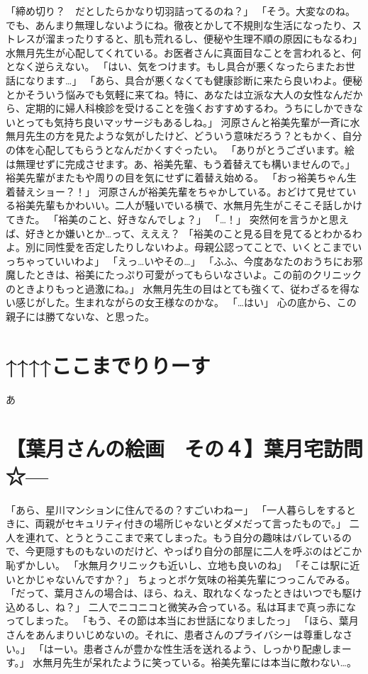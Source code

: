 「締め切り？　だとしたらかなり切羽詰ってるのね？」
「そう。大変なのね。でも、あんまり無理しないようにね。徹夜とかして不規則な生活になったり、ストレスが溜まったりすると、肌も荒れるし、便秘や生理不順の原因にもなるわ」
水無月先生が心配してくれている。お医者さんに真面目なことを言われると、何となく逆らえない。
「はい、気をつけます。もし具合が悪くなったらまたお世話になります…」
「あら、具合が悪くなくても健康診断に来たら良いわよ。便秘とかそういう悩みでも気軽に来てね。特に、あなたは立派な大人の女性なんだから、定期的に婦人科検診を受けることを強くおすすめするわ。うちにしかできないとっても気持ち良いマッサージもあるしね。」
河原さんと裕美先輩が一斉に水無月先生の方を見たような気がしたけど、どういう意味だろう？ともかく、自分の体を心配してもらうとなんだかくすぐったい。
「ありがとうございます。絵は無理せずに完成させます。あ、裕美先輩、もう着替えても構いませんので。」
裕美先輩がまたもや周りの目を気にせずに着替え始める。
「おっ裕美ちゃん生着替えショー？！」
河原さんが裕美先輩をちゃかしている。おどけて見せている裕美先輩もかわいい。二人が騒いでいる横で、水無月先生がこそこそ話しかけてきた。
「裕美のこと、好きなんでしょ？」
「…！」
突然何を言うかと思えば、好きとか嫌いとか…って、えええ？
「裕美のこと見る目を見てるとわかるわよ。別に同性愛を否定したりしないわよ。母親公認ってことで、いくとこまでいっちゃっていいわよ」
「えっ…いやその…」
「ふふ、今度あなたのおうちにお邪魔したときは、裕美にたっぷり可愛がってもらいなさいよ。この前のクリニックのときよりもっと過激にね。」
水無月先生の目はとても強くて、従わざるを得ない感じがした。生まれながらの女王様なのかな。
「…はい」
心の底から、この親子には勝てないな、と思った。

\section{↑↑↑↑ここまでりりーす}
あ

\section{【葉月さんの絵画　その４】葉月宅訪問　☆---}

「あら、星川マンションに住んでるの？すごいわねー」
「一人暮らしをするときに、両親がセキュリティ付きの場所じゃないとダメだって言ったもので。」
二人を連れて、とうとうここまで来てしまった。もう自分の趣味はバレているので、今更隠すものもないのだけど、やっぱり自分の部屋に二人を呼ぶのはどこか恥ずかしい。
「水無月クリニックも近いし、立地も良いのね」
「そこは駅に近いとかじゃないんですか？」
ちょっとボケ気味の裕美先輩につっこんでみる。
「だって、葉月さんの場合は、ほら、ねえ、取れなくなったときはいつでも駆け込めるし、ね？」
二人でニコニコと微笑み合っている。私は耳まで真っ赤になってしまった。
「もう、その節は本当にお世話になりましたっ」
「ほら、葉月さんをあんまりいじめないの。それに、患者さんのプライバシーは尊重しなさい。」
「はーい。患者さんが豊かな性生活を送れるよう、しっかり配慮しまーす。」
水無月先生が呆れたように笑っている。裕美先輩には本当に敵わない…。

